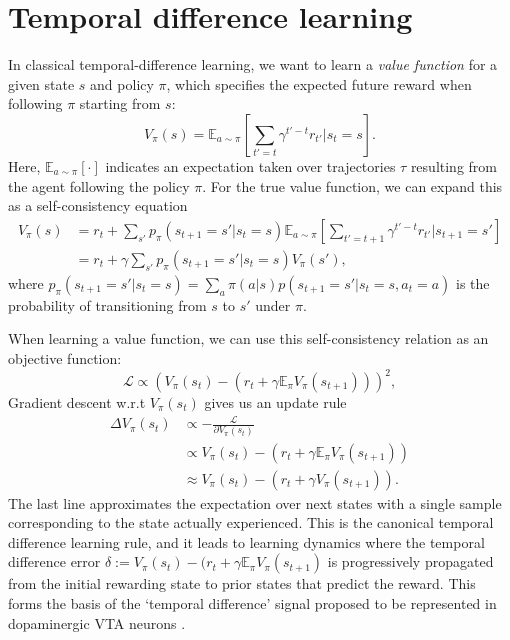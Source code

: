 \section{Temporal difference learning}
\label{sec:temporal_difference}

In classical temporal-difference learning, we want to learn a \emph{value function} for a given state $s$ and policy $\pi$, which specifies the expected future reward when following $\pi$ starting from $s$:
\begin{equation}
    \label{eq:V-values}
    V_{\pi}(s) = \mathbb{E}_{a \sim \pi} \left [ \sum_{t' = t} \gamma^{t' - t} r_{t'} | s_t = s \right ].
\end{equation}
Here, $\mathbb{E}_{a \sim \pi} [ \cdot ]$ indicates an expectation taken over trajectories $\tau$ resulting from the agent following the policy $\pi$.
For the true value function, we can expand this as a self-consistency equation
\begin{align}
    \label{eq:value_expansion}
    V_{\pi}(s) &= r_t + \sum_{s'} p_{\pi}(s_{t+1} = s' | s_t = s) \mathbb{E}_{a \sim \pi} \left [ \sum_{t' = t+1} \gamma^{t' - t} r_{t'} | s_{t+1} = s' \right ] \\
    &=  r_t + \gamma \sum_{s'} p_{\pi}(s_{t+1} = s' | s_t = s) V_{\pi}(s'),
\end{align}
where $p_{\pi}(s_{t+1} = s' | s_t = s) = \sum_a \pi(a|s) p(s_{t+1} = s' | s_t = s, a_t = a)$ is the probability of transitioning from $s$ to $s'$ under $\pi$.

When learning a value function, we can use this self-consistency relation as an objective function:
\begin{equation}
    \mathcal{L} \propto \left (  V_\pi(s_t) - (r_t + \gamma \mathbb{E}_\pi V_{\pi}(s_{t+1})) \right )^2,
\end{equation}
Gradient descent w.r.t $V_\pi(s_t)$ gives us an update rule
\begin{align}
    \label{eq:TD-learning}
    \Delta V_\pi(s_t) &\propto - \frac{\mathcal{L}}{\partial V_\pi(s_t)}\\
    &\propto V_\pi(s_t) - (r_t + \gamma \mathbb{E}_\pi V_{\pi}(s_{t+1}))\\
    &\approx V_\pi(s_t) - (r_t + \gamma V_{\pi}(s_{t+1})).
\end{align}
The last line approximates the expectation over next states with a single sample corresponding to the state actually experienced.
This is the canonical temporal difference learning rule, and it leads to learning dynamics where the temporal difference error $\delta := V_\pi(s_t) - (r_t + \gamma \mathbb{E}_\pi V_{\pi}(s_{t+1})$ is progressively propagated from the initial rewarding state to prior states that predict the reward.
This forms the basis of the `temporal difference' signal proposed to be represented in dopaminergic VTA neurons \citep{schultz1997neural}.

